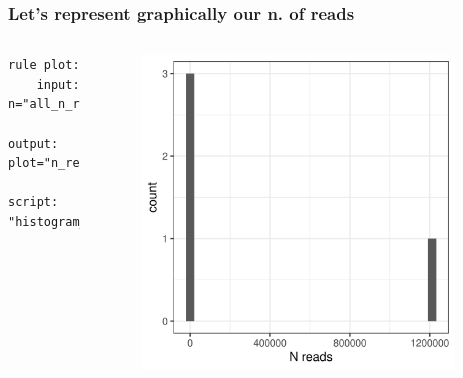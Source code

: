 \documentclass[xcolor=table]{beamer}
\begin{document}
\begin{frame}[fragile]
\frametitle{Let's represent graphically our n. of reads}
\begin{columns}
\begin{lstlisting}[basicstyle=\tiny]
rule plot:
    input: n="all_n_reads.txt"
    output: plot="n_reads.png"
    script: "histogram_reads.R"
\end{lstlisting}
\begin{figure}\includegraphics[width=0.95\textwidth]{./img/n_reads.png}\end{figure}
\end{columns}
\end{frame}
\end{document}
